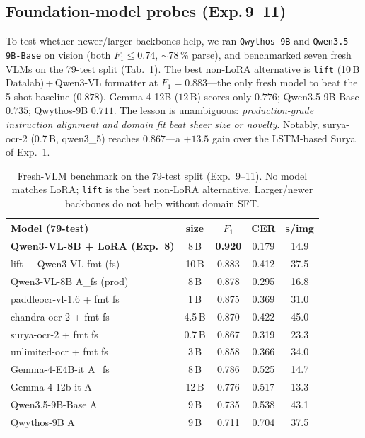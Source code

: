\subsection{Foundation-model probes (Exp.\,9--11)}
\label{sec:probes}
To test whether newer/larger backbones help, we ran \texttt{Qwythos-9B} and
\texttt{Qwen3.5-9B-Base} on vision (both $F_1\!\le\!0.74$, $\sim$78\,\% parse),
and benchmarked seven fresh VLMs on the 79-test split (Tab.~\ref{tab:probes}).
The best non-LoRA alternative is \texttt{lift} (10\,B
Datalab)\,+\,Qwen3-VL formatter at $F_1=0.883$---the only fresh model to beat
the 5-shot baseline ($0.878$). Gemma-4-12B ($12$\,B) scores only $0.776$;
Qwen3.5-9B-Base $0.735$; Qwythos-9B $0.711$. The lesson is unambiguous:
\emph{production-grade instruction alignment and domain fit beat sheer size or
novelty}. Notably, surya-ocr-2 (0.7\,B, qwen3\_5) reaches $0.867$---a $+13.5$
gain over the LSTM-based Surya of Exp.~1.

\begin{table}[t]
\centering
\small
\setlength{\tabcolsep}{3pt}
\begin{tabular}{@{}lcccc@{}}
\toprule
Model (79-test) & size & $F_1$ & CER & s/img \\
\midrule
\textbf{Qwen3-VL-8B + LoRA (Exp.~8)} & 8\,B & \textbf{0.920} & 0.179 & 14.9 \\
lift + Qwen3-VL fmt (fs)  & 10\,B & 0.883 & 0.412 & 37.5 \\
Qwen3-VL-8B A\_fs (prod)  & 8\,B & 0.878 & 0.295 & 16.8 \\
paddleocr-vl-1.6 + fmt fs & 1\,B & 0.875 & 0.369 & 31.0 \\
chandra-ocr-2 + fmt fs    & 4.5\,B & 0.870 & 0.422 & 45.0 \\
surya-ocr-2 + fmt fs      & 0.7\,B & 0.867 & 0.319 & 23.3 \\
unlimited-ocr + fmt fs    & 3\,B & 0.858 & 0.366 & 34.0 \\
Gemma-4-E4B-it A\_fs      & 8\,B & 0.786 & 0.525 & 14.7 \\
Gemma-4-12b-it A          & 12\,B & 0.776 & 0.517 & 13.3 \\
Qwen3.5-9B-Base A         & 9\,B & 0.735 & 0.538 & 43.1 \\
Qwythos-9B A              & 9\,B & 0.711 & 0.704 & 37.5 \\
\bottomrule
\end{tabular}
\caption{Fresh-VLM benchmark on the 79-test split (Exp.~9--11). No model
matches LoRA; \texttt{lift} is the best non-LoRA alternative. Larger/newer
backbones do not help without domain SFT.}
\label{tab:probes}
\end{table}

